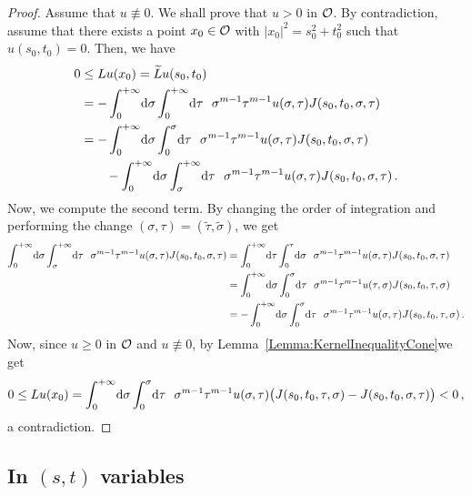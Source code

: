 \begin{proof}
Assume that $u \not \equiv 0$. We shall prove that $u > 0$ in $\mathcal{O}$. By contradiction, assume
that there exists a point $x_0\in \mathcal{O}$ with $|x_0|^2 = s_0^2 + t_0^2$ such that $u(s_0, t_0)= 0$.
Then, we have
\begin{align*}
0 &\leq Lu(x_0) = \widetilde{L} u (s_0,t_0) \\
&= - \int_0^{+\infty} \!\! \d \sigma \int_0^{+\infty} \!\! \d \tau \ \ \sigma^{m-1} \tau^{m-1} u(\sigma, \tau) J(s_0,t_0,\sigma, \tau)   \\
& = - \int_0^{+\infty}  \!\! \d \sigma \int_0^{\sigma}  \!\! \d \tau \ \ \sigma^{m-1} \tau^{m-1} u(\sigma, \tau) J(s_0,t_0,\sigma, \tau)   \\
& \quad \quad - \int_0^{+\infty}  \!\!  \d \sigma \int_{\sigma}^{+\infty} \!\!  \d \tau \ \ \sigma^{m-1} \tau^{m-1} u(\sigma, \tau) J(s_0,t_0,\sigma, \tau)\,.
\end{align*}
Now, we compute the second term. By changing the order of integration and performing the change $(\sigma,\tau) = (\tilde{\tau}, \tilde{\sigma})$, we get
\begin{align*}
\int_0^{+\infty} \!\!  \d \sigma \int_{\sigma}^{+\infty} \!\!  \d \tau \ \ \sigma^{m-1} \tau^{m-1} u(\sigma, \tau) J(s_0,t_0,\sigma, \tau) & =  \int_{0}^{+\infty}  \!\! \d \tau \int_0^{\tau}   \!\! \d \sigma \ \ \sigma^{m-1} \tau^{m-1} u(\sigma, \tau) J(s_0,t_0,\sigma, \tau)   \\
& =  \int_0^{+\infty}  \!\! \d \sigma \int_0^{\sigma}  \!\! \d \tau \ \ \sigma^{m-1} \tau^{m-1} u(\tau, \sigma) J(s_0,t_0,\tau, \sigma)   \\
& =  - \int_0^{+\infty}  \!\! \d \sigma \int_0^{\sigma}  \!\! \d \tau \ \ \sigma^{m-1} \tau^{m-1} u( \sigma, \tau) J(s_0,t_0,\tau, \sigma) \,.  \\
\end{align*}
Now, since $u\geq 0$ in $\mathcal{O}$ and $u \not \equiv 0$, by Lemma~\ref{Lemma:KernelInequalityCone}we
get
$$
0 \leq Lu(x_0) = \int_0^{+\infty}  \!\! \,\mathrm{d} \sigma \int_0^{\sigma}  \!\! \,\mathrm{d} \tau \ \ \sigma^{m-1} \tau^{m-1} u(\sigma, \tau) \big( J(s_0,t_0,\tau, \sigma) - J(s_0,t_0,\sigma, \tau)   \big ) < 0\,,
$$
a contradiction.
\end{proof}


\subsection{In $(s,t)$ variables}

